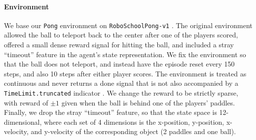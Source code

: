 \documentclass[coda.tex]{subfiles}
\begin{document}
\paragraph{Environment} We base our \texttt{Pong} environment on \texttt{RoboSchoolPong-v1} \cite{klimov2017roboschool}. The original environment allowed the ball to teleport back to the center after one of the players scored, offered a small dense reward signal for hitting the ball, and included a stray ``timeout'' feature in the agent's state representation. We fix the environment so that the ball does not teleport, and instead have the episode reset every 150 steps, and also 10 steps after either player scores. The environment is treated as continuous and never returns a done signal that is not also accompanied by a \texttt{TimeLimit.truncated} indicator \cite{brockman2016openai}. We change the reward to be strictly sparse, with reward of $\pm 1$ given when the ball is behind one of the players' paddles. Finally, we drop the stray ``timeout'' feature, so that the state space is 12-dimensional, where each set of 4 dimensions is the x-position, y-position, x-velocity, and y-velocity of the corresponding object (2 paddles and one ball). 
\end{document}
